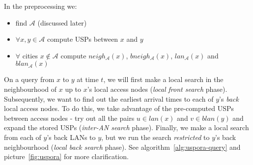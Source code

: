 \documentclass{svk_long_en}
\begin{document}
		In the preprocessing we:
		\begin{itemize}
			\item find $\mathcal{A}$ (discussed later)
			\item $\forall x, y \in \mathcal{A}$ compute USPs between $x$ and $y$
			\item $\forall$ cities  $x \not \in \mathcal{A}$ compute $neigh_{\mathcal{A}}(x)$, $bneigh_{\mathcal{A}}(x)$, $lan_{\mathcal{A}}(x)$ and $blan_{\mathcal{A}}(x)$
		\end{itemize}
		\hspace{\fill}
		
		On a query from $x$ to $y$ at time $t$, we will first make a local search in the neighbourhood of $x$ up to $x$'s local access nodes (\textit{local front search} phase). Subsequently, we want to find out the earliest arrival times to each of $y$'s \textit{back} local access nodes. To do this, we take advantage of the pre-computed USPs between access nodes - try out all the pairs $u \in lan(x)$ and $v \in blan(y)$ and expand the stored USPs (\textit{inter-AN search} phase). Finally, we make a local search from each of $y$'s back LANs to $y$, but we run the search \textit{restricted} to $y$'s back neighbourhood (\textit{local back search} phase). See algorithm~\ref{alg:uspora-query} and picture~\ref{fig:uspora} for more clarification.
		
\end{document}
